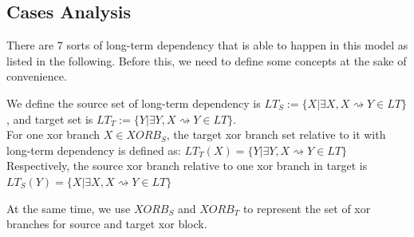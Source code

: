 \subsection{Cases Analysis}
There are 7 sorts of long-term dependency that is able to happen in this model as listed in the following. Before this, we need to define some concepts at the sake of convenience.
\begin{definition}
	We define the source set of long-term dependency is  $LT_S:= \{X \vert \exists X, X\rightsquigarrow Y  \in LT \} $, and target set is $LT_T:= \{Y \vert \exists Y, X\rightsquigarrow Y \in LT \} $. \\
	For one xor branch $X \in XORB_S$, the target xor branch set relative to it with long-term dependency is defined as:
	$ LT_T(X)= \{Y \vert \exists Y, X\rightsquigarrow Y \in LT \}$
	Respectively, the source xor branch relative to one xor branch in target is
	$ LT_S(Y)= \{X \vert \exists X, X\rightsquigarrow Y \in LT \}$
\end{definition}
At the same time, we use $XORB_S $ and $XORB_T$ to represent the set of xor branches for source and target xor block. 

